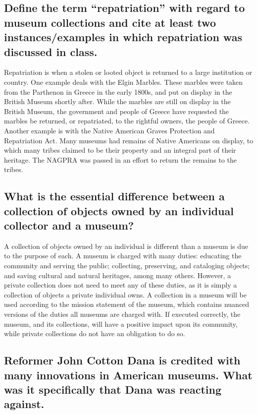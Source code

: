 \documentclass[11pt]{article}
\begin{document}
\singlespacing
\subsection*{Define the term ``repatriation'' with regard to museum collections and cite at least two instances/examples in which repatriation was discussed in class.}

\doublespacing
Repatriation is when a stolen or looted object is returned to a large institution or country. One example deals with the Elgin Marbles. These marbles were taken from the Parthenon in Greece in the early 1800s, and put on display in the British Museum shortly after. While the marbles are still on display in the British Museum, the government and people of Greece have requested the marbles be returned, or repatriated, to the rightful owners, the people of Greece. Another example is with the Native American Graves Protection and Repatriation Act. Many museums had remains of Native Americans on display, to which many tribes claimed to be their property and an integral part of their heritage. The NAGPRA was passed in an effort to return the remains to the tribes.

\singlespacing
\subsection*{What is the essential difference between a collection of objects owned by an individual collector and a museum?}

\doublespacing
A collection of objects owned by an individual is different than a museum is due to the purpose of each. A museum is charged with many duties: educating the community and serving the public; collecting, preserving, and cataloging objects; and saving cultural and natural heritages, among many others. However, a private collection does not need to meet any of these duties, as it is simply a collection of objects a private individual owns. A collection in a museum will be used according to the mission statement of the museum, which contains nuanced versions of the duties all museums are charged with. If executed correctly, the museum, and its collections, will have a positive impact upon its community, while private collections do not have an obligation to do so.

\singlespacing
\subsection*{Reformer John Cotton Dana is credited with many innovations in American museums. What was it specifically that Dana was reacting against.}
\end{document}
